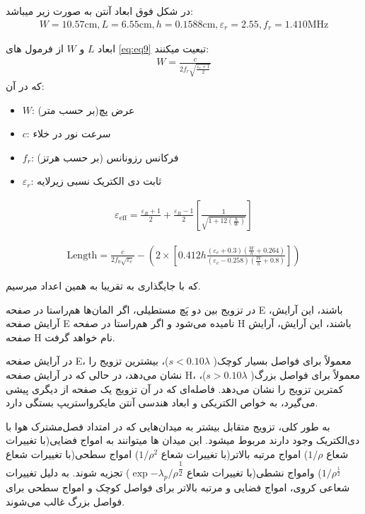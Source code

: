 در شکل فوق ابعاد آنتن به صورت زیر میباشد:
\begin{align}
	\label{eq:eq8}
	W = 10.57 \text{cm}, L = 6.55 \text{cm}, h = 0.1588 \text{cm}, \varepsilon_r = 2.55, f_r = 1.410 \text{MHz}
\end{align}

ابعاد
$ L$
 و
 $ W$
  از فرمول های 
  \ref{eq:eq9}
   تبعیت میکنند:
\begin{align}
	\label{eq:eq9}
	W = \frac{c}{2f_r\sqrt{\frac{\varepsilon_r+1}{2}}}
\end{align}
که در آن:
\begin{itemize}
	\item{$W$:
	عرض پچ(بر حسب متر)
	}
	\item{$c$:
	سرعت نور در خلاء
	}
	\item{$f_r$:
	فرکانس رزونانس (بر حسب هرتز)
	}
	\item{$\varepsilon_{r}$:
	ثابت دی الکتریک نسبی زیرلایه
	}
\end{itemize}


\begin{align}
	\label{eq:eq10}
	\varepsilon_{\text{eff}} = \frac{\varepsilon_R+1}{2} + \frac{\varepsilon_R-1}{2}\left[\frac{1}{\sqrt{1+12\left(\frac{h}{W}\right)}}\right]
\end{align}

\begin{align}
	\label{eq:eq11}
	\text{Length} = \frac{c}{2f_0\sqrt{\varepsilon_{e}}} - \left(2 \times \left[0.412h\frac{(\varepsilon_{e}+0.3)\left(\frac{W}{h}+0.264\right)}{(\varepsilon_{e}-0.258)\left(\frac{W}{h}+0.8\right)}\right]\right)
\end{align}

که با جایگذاری به تقریبا به همین اعداد میرسیم.


در تزویج بین دو پَچ مستطیلی، اگر المان‌ها هم‌راستا در صفحه E باشند، این آرایش، آرایش صفحه E نامیده می‌شود و اگر هم‌راستا در صفحه H باشند، این آرایش، آرایش صفحه H نام خواهد گرفت.

در آرایش صفحه E، معمولاً برای فواصل بسیار کوچک(
$s < 0.10\lambda$)،
 بیشترین تزویج را نشان می‌دهد، در حالی که در آرایش صفحه H، معمولاً برای فواصل بزرگ(
 $s > 0.10\lambda$)،
  کمترین تزویج را نشان می‌دهد. فاصله‌ای که در آن تزویج یک صفحه از دیگری پیشی می‌گیرد، به خواص الکتریکی و ابعاد هندسی آنتن مایکرواستریپ بستگی دارد.

به طور کلی، تزویج متقابل بیشتر به میدان‌هایی که در امتداد فصل‌مشترک هوا با دی‌الکتریک وجود دارند مربوط میشود. این میدان ها میتوانند به امواج فضایی(با تغییرات شعاع
$1/\rho$)
امواج مرتبه بالاتر(با تغییرات شعاع
$1/\rho^2$)
امواج سطحی(با تغییرات شعاع
$1/\rho^{\frac{1}{2}}$)
وامواج نشطی(با تغییرات شعاع
$\exp{-\lambda_{p}/\rho^{\dfrac{1}{2}}}$)
تجزیه شوند. به دلیل تغییرات شعاعی کروی، امواج فضایی و مرتبه بالاتر برای فواصل کوچک و امواج سطحی برای فواصل بزرگ غالب می‌شوند.


